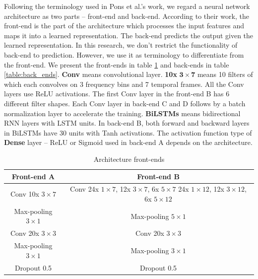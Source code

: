 Following the terminology used in Pons et al.'s work\cite{Pons2017}, we regard a neural network architecture as two parts -- front-end and back-end. According to their work, the front-end is the part of the architecture which processes the input features and maps it into a learned representation. The back-end predicts the output given the learned representation. In this research, we don't restrict the functionality of back-end to prediction. However, we use it as terminology to differentiate from the front-end. We present the front-ends in table \ref{table:frond_ends} and back-ends in table \ref{table:back_ends}. \textbf{Conv} means convolutional layer. \textbf{10x} $\boldsymbol{3\times7}$ means 10 filters of which each convolves on 3 frequency bins and 7 temporal frames. All the Conv layers use ReLU activations. The first Conv layer in the front-end B has 6 different filter shapes. Each Conv layer in back-end C and D follows by a batch normalization layer to accelerate the training\cite{Ioffe2015}. \textbf{BiLSTMs} means bidirectional RNN layers with LSTM units. In back-end B, both forward and backward layers in BiLSTMs have 30 units with Tanh activations. The activation function type of \textbf{Dense} layer -- ReLU or Sigmoid used in back-end A depends on the architecture.

\begin{table}[ht!]
\centering
\caption{Architecture front-ends}
\label{table:frond_ends}
\begin{tabular}{c|c}
\toprule
Front-end A & Front-end B \\
\midrule
Conv 10x $3{\times}7$ & \makecell{Conv 24x $1{\times}7$, 12x $3{\times}7$, 6x $5{\times}7$\\24x $1{\times}12$, 12x $3{\times}12$, 6x $5{\times}12$} \\
Max-pooling $3{\times}1$ & Max-pooling $5{\times}1$ \\
Conv 20x $3{\times}3$ & Conv 20x $3{\times}3$ \\
Max-pooling $3{\times}1$ & Max-pooling $3{\times}1$\\
Dropout 0.5 & Dropout 0.5\\
\bottomrule

\end{tabular}
\end{table}

